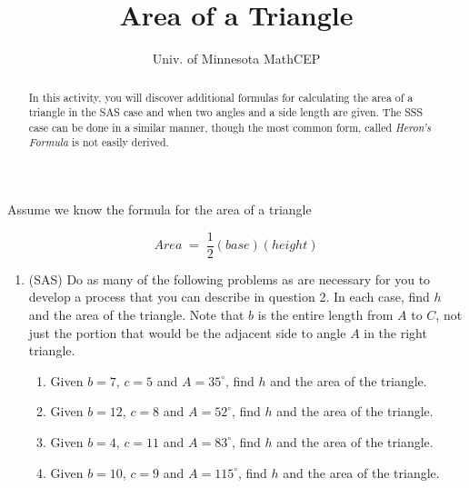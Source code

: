 \documentclass[number]{ximera}
\title{Area of a Triangle}
\author{Univ. of Minnesota MathCEP}
\begin{document}
\begin{abstract}
  In this activity, you will discover additional formulas for calculating the area of a triangle in the SAS case and when two angles and a side length are given. The SSS case can be done in a similar manner, though the most common form, called {\it{Heron's Formula}} is not easily derived.
\end{abstract}

\maketitle

Assume we know the formula for the area of a triangle

$$Area \; = \; \frac{1}{2}(base)(height)$$

\begin{enumerate}

\item (SAS) Do as many of the following problems as are necessary for you to develop a process that you can describe in question 2. In each case, find $h$ and the area of the triangle. Note that $b$ is the entire length from $A$ to $C$, not just the portion that would be the adjacent side to angle $A$ in the right triangle.

\begin{enumerate}

\item Given $b = 7$, $c=5$ and $A = 35^\circ$, find $h$ and the area of the triangle.

 
\item Given $b = 12$, $c=8$ and $A = 52^\circ$, find $h$ and the area of the triangle.
\item Given $b = 4$, $c=11$ and $A = 83^\circ$, find $h$ and the area of the triangle.
\item Given $b = 10$, $c=9$ and $A = 115^\circ$, find $h$ and the area of the triangle.
 

\end{enumerate}
\end{enumerate}
\end{document}
